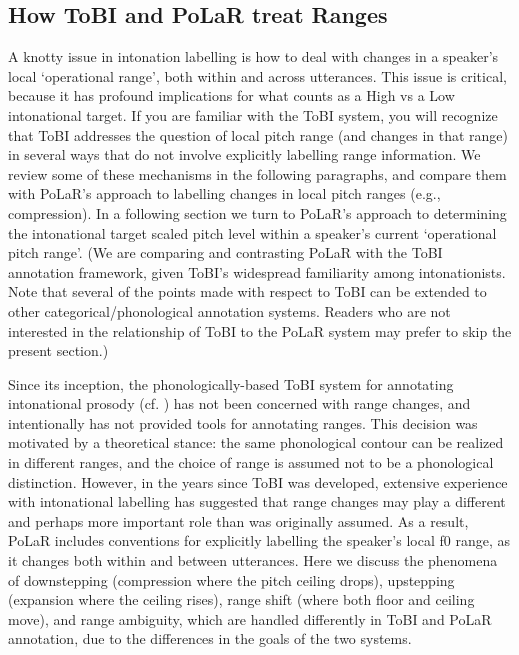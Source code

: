 \documentclass[11pt, twoside]{memoir}
\begin{document}
\subsection{How ToBI and PoLaR treat Ranges}\label{sec:how-tobi-and-polar-treat-ranges}
A knotty issue in intonation labelling is how to deal with changes in a speaker’s local ‘operational range’, both within and across utterances.  This issue is critical, because it has profound implications for what counts as a High vs a Low intonational target.  If you are familiar with the ToBI system, you will recognize that ToBI addresses the question of local pitch range (and changes in that range) in several ways that do not involve explicitly labelling range information. We review some of these mechanisms in the following paragraphs, and compare them with PoLaR’s approach to labelling changes in local pitch ranges (e.g., compression).  In a following section we turn to PoLaR’s approach to determining the intonational target scaled pitch level within a speaker’s current ‘operational pitch range’. (We are comparing and contrasting PoLaR with the ToBI annotation framework, given ToBI’s widespread familiarity among intonationists. Note that several of the points made with respect to ToBI can be extended to other categorical\slash phonological annotation systems. Readers who are not interested in the relationship of ToBI to the PoLaR system may prefer to skip the present section.)

Since its inception, the phonologically-based ToBI system for annotating intonational prosody (cf. \citealt{beckman-05}) has not been concerned with range changes, and intentionally has not provided tools for annotating ranges.  This decision was motivated by a theoretical stance: the same phonological contour can be realized in different ranges, and the choice of range is assumed not to be a phonological distinction.  However, in the years since ToBI was developed, extensive experience with intonational labelling has suggested that range changes may play a different and perhaps more important role than was originally assumed.  As a result, PoLaR includes conventions for explicitly labelling the speaker’s local f0 range, as it changes both within and between utterances. Here we discuss the phenomena of downstepping (compression where the pitch ceiling drops), upstepping (expansion where the ceiling rises), range shift (where both floor and ceiling move), and range ambiguity, which are handled differently in ToBI and PoLaR annotation, due to the differences in the goals of the two systems.
\end{document}
